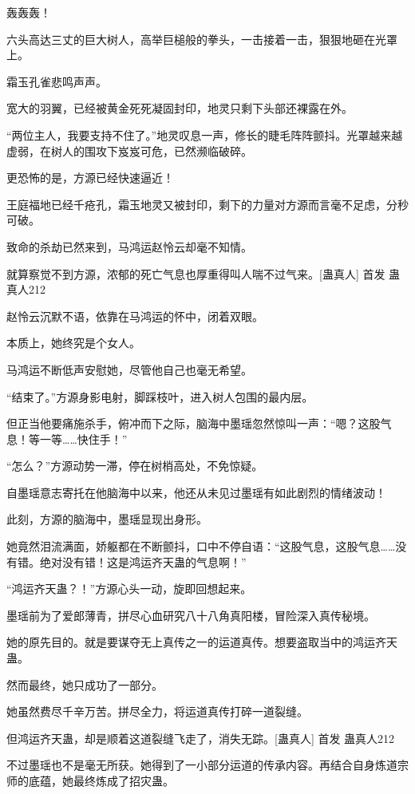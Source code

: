 
\begin{this_body}

轰轰轰！

六头高达三丈的巨大树人，高举巨槌般的拳头，一击接着一击，狠狠地砸在光罩上。

霜玉孔雀悲鸣声声。

宽大的羽翼，已经被黄金死死凝固封印，地灵只剩下头部还裸露在外。

“两位主人，我要支持不住了。”地灵叹息一声，修长的睫毛阵阵颤抖。光罩越来越虚弱，在树人的围攻下岌岌可危，已然濒临破碎。

更恐怖的是，方源已经快速逼近！

王庭福地已经千疮孔，霜玉地灵又被封印，剩下的力量对方源而言毫不足虑，分秒可破。

致命的杀劫已然来到，马鸿运赵怜云却毫不知情。

就算察觉不到方源，浓郁的死亡气息也厚重得叫人喘不过气来。[蛊真人]  首发 蛊真人212

赵怜云沉默不语，依靠在马鸿运的怀中，闭着双眼。

本质上，她终究是个女人。

马鸿运不断低声安慰她，尽管他自己也毫无希望。

“结束了。”方源身影电射，脚踩枝叶，进入树人包围的最内层。

但正当他要痛施杀手，俯冲而下之际，脑海中墨瑶忽然惊叫一声：“嗯？这股气息！等一等……快住手！”

“怎么？”方源动势一滞，停在树梢高处，不免惊疑。

自墨瑶意志寄托在他脑海中以来，他还从未见过墨瑶有如此剧烈的情绪波动！

此刻，方源的脑海中，墨瑶显现出身形。

她竟然泪流满面，娇躯都在不断颤抖，口中不停自语：“这股气息，这股气息……没有错。绝对没有错！这是鸿运齐天蛊的气息啊！”

“鸿运齐天蛊？！”方源心头一动，旋即回想起来。

墨瑶前为了爱郎薄青，拼尽心血研究八十八角真阳楼，冒险深入真传秘境。

她的原先目的。就是要谋夺无上真传之一的运道真传。想要盗取当中的鸿运齐天蛊。

然而最终，她只成功了一部分。

她虽然费尽千辛万苦。拼尽全力，将运道真传打碎一道裂缝。

但鸿运齐天蛊，却是顺着这道裂缝飞走了，消失无踪。[蛊真人]  首发 蛊真人212

不过墨瑶也不是毫无所获。她得到了一小部分运道的传承内容。再结合自身炼道宗师的底蕴，她最终炼成了招灾蛊。


\end{this_body}
